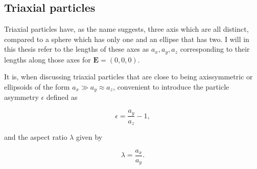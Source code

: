 
\subsection{Triaxial particles}
Triaxial particles have, as the name suggests, three axis which are all distinct, compared to a sphere which has only one and an ellipse that has two. I will in this thesis refer to the lengths of these axes as $a_x, a_y, a_z$ corresponding to their lengths along those axes for $\mathbf{E} = (0,0,0)$. 

It is, when discussing triaxial particles that are close to being axissymmetric or ellipsoids of the form $a_x \gg a_y \approx a_z$, convenient to introduce the particle asymmetry $\epsilon$ defined as

\begin{equation}\label{eq:epsilon}
\epsilon = \frac{a_y}{a_z} - 1,
\end{equation}

and the aspect ratio $\lambda$ given by

\begin{equation}\label{eq:lambda}
\lambda = \frac{a_x}{a_y}.
\end{equation}






